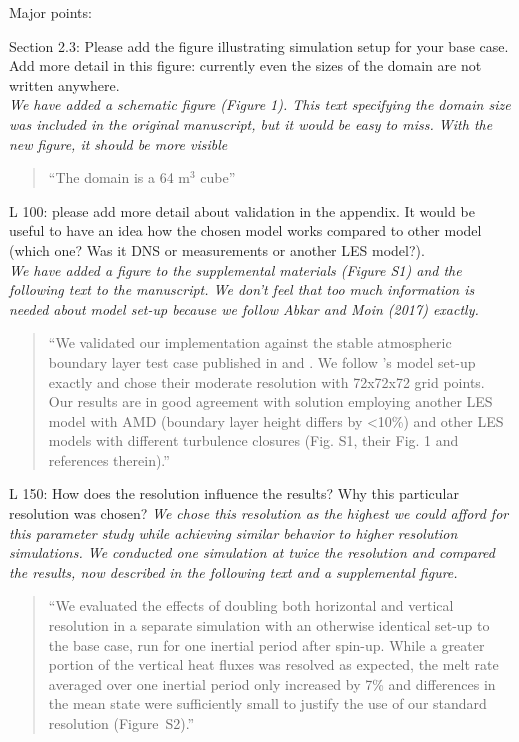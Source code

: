 \documentclass[tc, manuscript]{copernicus}
\begin{document}
Major points:\vspace{12pt}

Section 2.3: Please add the figure illustrating simulation setup for your base case. Add more detail in this figure: currently even the sizes of the domain are not written anywhere.\\
\textit{We have added a schematic figure (Figure 1). This text specifying the domain size was included in the original manuscript, but it would be easy to miss. With the new figure, it should be more visible}
\begin{quote}
``The domain is a 64 m$^3$ cube''
\end{quote}\vspace{12pt}

L 100: please add more detail about validation in the appendix. It would be useful to have an idea how the chosen model works compared to other model (which one? Was it DNS or measurements or another LES model?).\\
\textit{We have added a figure to the supplemental materials (Figure S1) and the following text to the manuscript. We don't feel that too much information is needed about model set-up because we follow Abkar and Moin (2017) exactly.}
\begin{quote}
``We validated our implementation against the stable atmospheric boundary layer test case published in \citet{abkar_large-eddy_2017} and \citet{stoll_large-eddy_2008}. We follow \citet[]['s]{abkar_large-eddy_2017}'s model set-up exactly and chose their moderate resolution with 72x72x72 grid points. Our results are in good agreement with \citet[]['s]{abkar_large-eddy_2017} solution employing another LES model with AMD (boundary layer height differs by <10\%) and other LES models with different turbulence closures (Fig. S1, their Fig. 1 and references therein).''
\end{quote}\vspace{12pt}

L 150: How does the resolution influence the results? Why this particular resolution was chosen?
\textit{We chose this resolution as the highest we could afford for this parameter study while achieving similar behavior to higher resolution simulations. We conducted one simulation at twice the resolution and compared the results, now described in the following text and a supplemental figure.}
\begin{quote}
``We evaluated the effects of doubling both horizontal and vertical resolution in a separate simulation with an otherwise identical set-up to the base case, run for one inertial period after spin-up. While a greater portion of the vertical heat fluxes was resolved as expected, the melt rate averaged over one inertial period only increased by 7\% and differences in the mean state were sufficiently small to justify the use of our standard resolution (Figure~S2).''
\end{quote}
\vspace{12pt}
\end{document}
